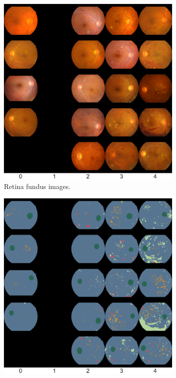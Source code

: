 \begin{figure}[h]
    \centering
    \begin{subfigure}{0.45\textwidth}
        \centering
        \includegraphics[width=\textwidth]{datasets/figs/idrid_real_sample.pdf}
        \caption{Retina fundus images.}
        \label{fig:idrid_sample_real}
    \end{subfigure} %
    \begin{subfigure}{0.45\textwidth}
        \centering
        \includegraphics[width=\textwidth]{datasets/figs/idrid_label_sample.pdf}

\end{subfigure}
\end{figure}

